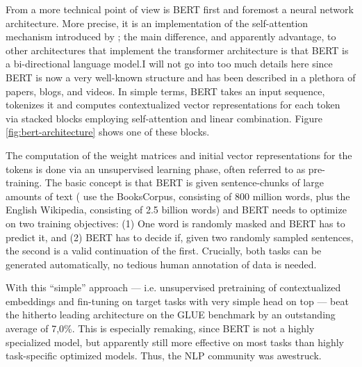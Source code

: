 From a more technical point of view is BERT first and foremost a neural
network architecture. More precise, it is an implementation of the
self-attention mechanism introduced by \cite{vaswani2017attention}; the
main difference, and apparently advantage, to other architectures
that implement the transformer architecture is that  BERT is a bi-directional
language model.I will not go into too much details here since BERT is
now a very well-known structure and has been described in a
plethora of papers, blogs, and videos.%
In simple terms, BERT takes an input sequence, tokenizes it and computes contextualized vector
representations for each token via stacked blocks employing self-attention and linear combination.
Figure \ref{fig:bert-architecture} shows one of these blocks.


The computation of the weight matrices and initial vector representations for the tokens is done
via an unsupervised learning phase, often referred to as pre-training. The basic concept is
that BERT is given sentence-chunks of large amounts of text (\citeauthor{devlin2018bert} use the BooksCorpus, consisting
of 800 million words, plus the English Wikipedia, consisting of 2.5 billion words) and BERT
needs to optimize on two training objectives: (1) One word is randomly masked and BERT has
to predict it, and (2) BERT has to decide if, given two randomly sampled sentences, the second
is a valid continuation of the first. Crucially, both tasks can be generated automatically, no
tedious human annotation of data is needed.

With this ``simple'' approach --- i.e. unsupervised pretraining of contextualized embeddings and
fin-tuning on target tasks with very simple head on top --- \citeauthor{devlin2018bert} beat the
hitherto leading architecture on the GLUE benchmark by an outstanding average of 7,0\%. This is
especially remaking, since BERT is not a highly specialized model, but
apparently still more effective on most tasks than highly task-specific optimized models.
Thus, the NLP community was awestruck.
